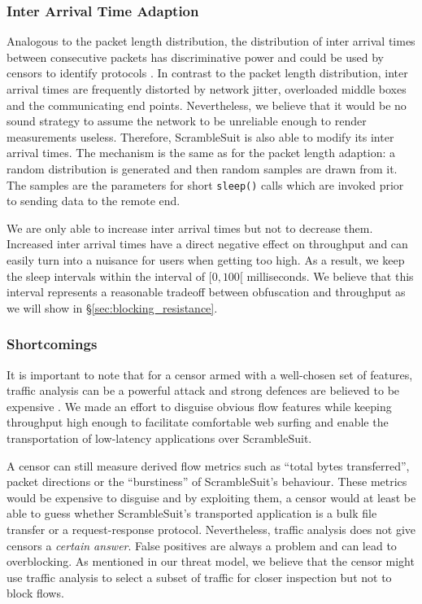 \documentclass{sig-alternate}
\newcommand{\pt}{\textsf{ScrambleSuit}}
\numberwithin{enumi}{section}
\numberwithin{notesctr}{section}
\begin{document}
\subsubsection{Inter Arrival Time Adaption}
Analogous to the packet length distribution, the distribution of inter arrival times between
consecutive packets has discriminative power and could be used by censors to identify protocols
\cite{Jaber2011}. In contrast to the packet length distribution, inter arrival times are frequently
distorted by network jitter, overloaded middle boxes and the communicating end points. Nevertheless,
we believe that it would be no sound strategy to assume the network to be unreliable enough to
render measurements useless. Therefore, \pt{} is also able to modify its inter arrival times. The
mechanism is the same as for the packet length adaption: a random distribution is generated and then
random samples are drawn from it. The samples are the parameters for short \texttt{sleep()} calls
which are invoked prior to sending data to the remote end.

We are only able to increase inter arrival times but not to decrease them. Increased inter arrival
times have a direct negative effect on throughput and can easily turn into a nuisance for users when
getting too high. As a result, we keep the sleep intervals within the interval of $[0, 100[$
milliseconds. We believe that this interval represents a reasonable tradeoff between obfuscation
and throughput as we will show in \S \ref{sec:blocking_resistance}.




\newpage
\subsubsection{Shortcomings}
\label{sec:shortcomings}
It is important to note that for a censor armed with a well-chosen set of features, traffic analysis
can be a powerful attack and strong defences are believed to be expensive \cite{Dyer2012b,Cai2012}.
We made an effort to disguise obvious flow features while keeping throughput high enough to
facilitate comfortable web surfing and enable the transportation of low-latency applications over
\pt{}.

A censor can still measure derived flow metrics such as ``total bytes transferred'', packet
directions or the ``burstiness'' of \pt{}'s behaviour. These metrics would be expensive to disguise
and by exploiting them, a censor would at least be able to guess whether \pt{}'s transported
application is a bulk file transfer or a request-response protocol. Nevertheless, traffic analysis
does not give censors a \emph{certain answer}. False positives are always a problem and can lead to
overblocking. As mentioned in our threat model, we believe that the censor might use traffic
analysis to select a subset of traffic for closer inspection but not to block flows.
\end{document}
